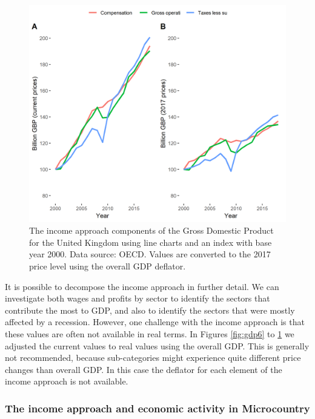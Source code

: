 \documentclass[]{book}
\begin{document}
\begin{figure}

{\centering \includegraphics[width=0.9\linewidth]{_resources/chapter_gdp/fig6} 

}

\caption{The income approach components of the Gross Domestic Product for the United Kingdom using line charts and an index with base year 2000. Data source: OECD.  Values are converted to the 2017 price level using the overall GDP deflator.}\label{fig:gdp8}
\end{figure}

It is possible to decompose the income approach in further detail. We can investigate both wages and profits by sector to identify the sectors that contribute the most to GDP, and also to identify the sectors that were mostly affected by a recession. However, one challenge with the income approach is that these values are often not available in real terms. In Figures \ref{fig:gdp6} to \ref{fig:gdp8} we adjusted the current values to real values using the overall GDP. This is generally not recommended, because sub-categories might experience quite different price changes than overall GDP. In this case the deflator for each element of the income approach is not available.

\hypertarget{the-income-approach-and-economic-activity-in-microcountry}{%
\subsubsection{The income approach and economic activity in Microcountry}\label{the-income-approach-and-economic-activity-in-microcountry}}
\end{document}

